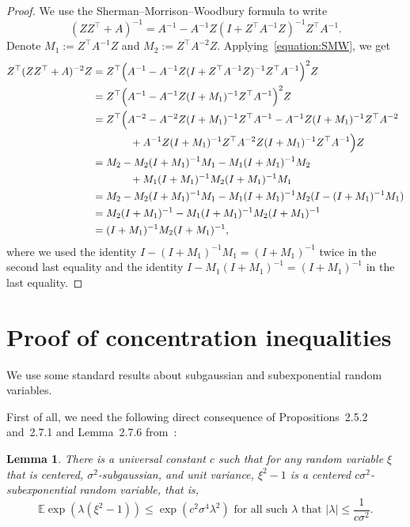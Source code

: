 \documentclass[11pt,notitlepage]{article}
\newcommand\E {\mathbb{E}}
\newtheorem{lemma}[theorem]{Lemma}
\begin{document}
\begin{proof}
  We use the Sherman–Morrison–Woodbury formula to write
  \begin{equation}\label{equation:SMW}
    (ZZ^\top + A)^{-1}
    = A^{-1} - A^{-1}Z(I + Z^\top A^{-1}Z)^{-1}Z^\top A^{-1}.
  \end{equation}
  Denote $M_1:= Z^\top A^{-1}Z$ and $M_2:= Z^\top A^{-2}Z$.
  Applying~\eqref{equation:SMW}, we get
	\begin{align*}
	Z^\top(ZZ^\top + A)^{-2} Z 
	& = Z^\top \Bigl(A^{-1} - A^{-1}Z(I + Z^\top A^{-1}Z)^{-1}Z^\top A^{-1}\Bigr)^2Z \\
	& = Z^\top \Bigl(A^{-1} - A^{-1}Z(I + M_1)^{-1}Z^\top A^{-1}\Bigr)^2Z \\
	& = Z^\top \Bigl(
                 A^{-2}
                 - A^{-2}Z(I + M_1)^{-1}Z^\top A^{-1} 
                 - A^{-1}Z(I + M_1)^{-1}Z^\top A^{-2}
                  \\
        & \hspace{0.5in}
          + A^{-1}Z(I + M_1)^{-1}Z^\top A^{-2}Z(I + M_1)^{-1}Z^\top A^{-1}
                \Bigr)Z \\
	& = M_2 - M_2(I + M_1)^{-1}M_1 
      - M_1(I + M_1)^{-1}M_2 \\
        & \hspace{0.5in}
          + M_1(I + M_1)^{-1}M_2(I + M_1)^{-1}M_1\\
	& = M_2 - M_2(I + M_1)^{-1}M_1 
      - M_1(I + M_1)^{-1}M_2 (I - (I + M_1)^{-1}M_1) \\
	& = M_2(I + M_1)^{-1} -  M_1(I + M_1)^{-1}M_2(I + M_1)^{-1}\\
	& = (I + M_1)^{-1}M_2(I + M_1)^{-1},
	\end{align*}
  where we used the identity $I - (I + M_1)^{-1}M_1 = (I + M_1)^{-1}$
  twice in the second last equality and the identity
  $I - M_1(I + M_1)^{-1} = (I + M_1)^{-1}$ in the last equality.
\end{proof}

\section{Proof of concentration inequalities}\label{appendix:concentration}

We use some standard results about subgaussian and
subexponential random variables.

First of all, we need the following direct consequence of
Propositions~2.5.2 and~2.7.1 and Lemma~2.7.6
from~\cite{vershynin_2018}:
\begin{lemma}\label{lemma:square of subgaussian}
    There is a universal constant $c$ such that for any
    random variable $\xi$ that is centered, $\sigma^2$-subgaussian,
    and unit variance, $\xi^2 - 1$ is a centered
    $c\sigma^2$-subexponential random variable, that is,
	  \[
		\E\exp(\lambda(\xi^2 - 1)) \leq
        \exp(c^2\sigma^4\lambda^2)\text{ for all such $\lambda$ that }
        |\lambda| \leq \frac{1}{c\sigma^2}.
	\]
\end{lemma}
\end{document}
